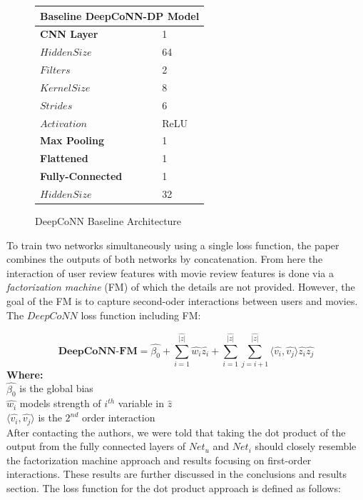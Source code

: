 \documentclass[10pt,twocolumn,letterpaper]{article}
\begin{document}
\begin{figure}[!ht]
\begin{center}
{
\begin{tabular}{ |p{3cm}|p{1cm}| }
 \hline
 \multicolumn{2}{|c|}{\textbf{Baseline DeepCoNN-DP Model}} \\
 \hline
 \textbf{CNN Layer} & 1  \\
 $Hidden Size$ & 64 \\
 $Filters$   & 2    \\
 $Kernel Size$ &   8\\
 $Strides$ & 6 \\
 $Activation$    & ReLU \\
 \hline
 \textbf{Max Pooling} &   1  \\
   \hline
 \textbf{Flattened} & 1    \\
  \hline
 \textbf{Fully-Connected} & 1  \\
  $Hidden Size$ & 32 \\

 \hline
\end{tabular}
}
\end{center}
\caption{DeepCoNN Baseline Architecture}
\end{figure}


To train two networks simultaneously using a single loss function, the paper combines the outputs of both networks by concatenation. From here the interaction of user review features with movie review features is done via a \textit{factorization machine} (FM) of which the details are not provided. However, the goal of the FM is to capture second-oder interactions between users and movies. The $DeepCoNN$ loss function including FM:

$$
\textbf{DeepCoNN-FM} = \hat{\beta_{0}} + \sum_{i=1}^{\hat{|z|}}\hat{w_{i}}\hat{z_{i}} + \sum_{i=1}^{\hat{|z|}} 
\sum_{j=i+1}^{\hat{|z|}} \langle \hat{v_i}, \hat{v_j} \rangle \hat{z_i}\hat{z_j}
$$
\textbf{Where:}\\
$\hat{\beta_0}$ is the global bias\\
$\hat{w_i}$ models strength of $i^{th}$ variable in $\hat{z}$\\
$\langle\hat{v_i}, \hat{v_j} \rangle$ is the $2^{nd}$ order interaction\\


After contacting the authors, we were told that taking the dot product of the output from the fully connected layers of $Net_{u}$ and $Net_{i}$ should closely resemble the factorization machine approach and results focusing on first-order interactions. These results are further discussed in the conclusions and results section. The loss function for the dot product approach is defined as follows:
\end{document}
